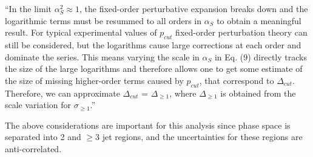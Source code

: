 ``In the limit $\alpha_S^2 \approx 1$, the fixed-order perturbative expansion breaks down and the logarithmic terms must be resummed to all orders in $\alpha_S$ to obtain a meaningful result.  For typical experimental values of $p_{cut}$ fixed-order perturbation theory can still be considered, but the logarithms cause large corrections at each order and dominate the series.  This means varying the scale in $\alpha_S$ in Eq. (9) directly tracks the size of the large logarithms and therefore allows one to get some estimate of the size of missing higher-order terms caused by $p_{cut}$, that correspond to $\Delta_{cut}$.  Therefore, we can approximate $\Delta_{cut}$ = $\Delta_{\ge 1}$, where $\Delta_{\ge 1}$ is obtained from the scale variation for $\sigma_{\ge 1}$.''


The above considerations are important for this analysis since phase space is separated into 2 and $\ge3$ jet regions, and the uncertainties for these regions are anti-correlated.%


